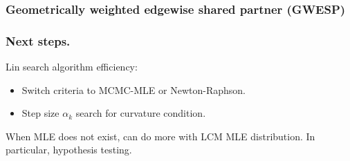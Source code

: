\documentclass[ 10pt]{beamer}
\newcommand{\etaLCM}{\hat{\eta}_{\textrm{LCM}}}
\begin{document}
\frame
{
\frametitle{Geometrically weighted edgewise shared partner (GWESP)}

}

\frame
{
\frametitle{Next steps.}

Lin search algorithm efficiency:
\begin{itemize}
	\item Switch criteria to MCMC-MLE or Newton-Raphson.  
	\item Step size $\alpha_k$ search for curvature condition.
\end{itemize}
\vspace{2mm}

When MLE does not exist, can do more with LCM MLE distribution.  In particular, hypothesis testing.
}


%
%
%
%
%
%
\end{document}
